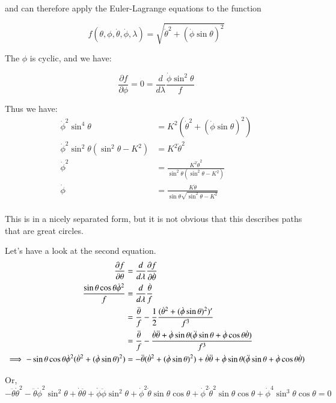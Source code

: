 \documentclass{article}      %
\newcommand{\dottheta}[0]{\dot{\theta}}
\newcommand{\ddottheta}[0]{\ddot{\theta}}
\newcommand{\dotphi}[0]{\dot{\phi}}
\newcommand{\ddotphi}[0]{\ddot{\phi}}
\newcommand{\PD}[2]{\frac{\partial {#2}}{\partial {#1}}}
\begin{document}
and can therefore apply the Euler-Lagrange equations to the function

\begin{equation*}
f(\theta, \phi, \dottheta, \dotphi, \lambda) = 
\sqrt{\dottheta^2 + ( \dotphi \sin\theta )^2 }
\end{equation*}

The $\phi$ is cyclic, and we have:

\begin{equation*}
\PD{\phi}{f} = 0 = \frac{d}{d\lambda} \frac{\dotphi \sin^2\theta}{f}
\end{equation*}

Thus we have:
\begin{align*}
\dotphi^2 \sin^4\theta &= K^2 \left(\dottheta^2 + ( \dotphi \sin\theta )^2 \right) \\
\dotphi^2 \sin^2\theta( \sin^2\theta - K^2 ) &= K^2 \dottheta^2 \\
\dotphi^2 
&= \frac{K^2 \dottheta^2 }{ \sin^2\theta ( \sin^2\theta - K^2 ) } \\
\dotphi
&= \frac{K \dottheta }{ \sin\theta \sqrt{ \sin^2\theta - K^2 } } \\
\end{align*}

This is in a nicely separated form, but it is not obvious that this describes paths that are great circles.

Let's have a look at the second equation.
\begin{align*}
\PD{\theta}{f} &= \frac{d}{d\lambda} \PD{\dottheta}{f} \\
\frac{\sin\theta\cos\theta \dotphi^2}{f}
&= \frac{d}{d\lambda} \frac{\dottheta}{f} \\
&= \frac{\ddottheta}{f} - \inv{2} \frac{ (\dottheta^2 + ( \dotphi \sin\theta )^2 )' }{f^3} \\
&= \frac{\ddottheta}{f} - \frac{ \dottheta \ddottheta + \dotphi \sin\theta ( \ddotphi \sin\theta + \dotphi \cos\theta \dottheta ) }{f^3} \\
\implies
-\sin\theta\cos\theta \dotphi^2 ( \dottheta^2 + ( \dotphi \sin\theta )^2 )
&= -\ddottheta ( \dottheta^2 + ( \dotphi \sin\theta )^2 )
   + \dottheta \ddottheta 
   + \dotphi \sin\theta ( \ddotphi \sin\theta + \dotphi \cos\theta \dottheta ) \\
\end{align*}

Or,
\begin{equation*}
- \ddottheta \dottheta^2 
- \ddottheta \dotphi^2 \sin^2\theta 
+ \dottheta \ddottheta 
+ \dotphi \ddotphi \sin^2\theta
+ \dotphi^2 \dottheta \sin\theta \cos\theta
+ \dotphi^2 \dottheta^2 \sin\theta \cos\theta 
+ \dotphi^4 \sin^3\theta \cos\theta 
= 0
\end{equation*}
\end{document}
